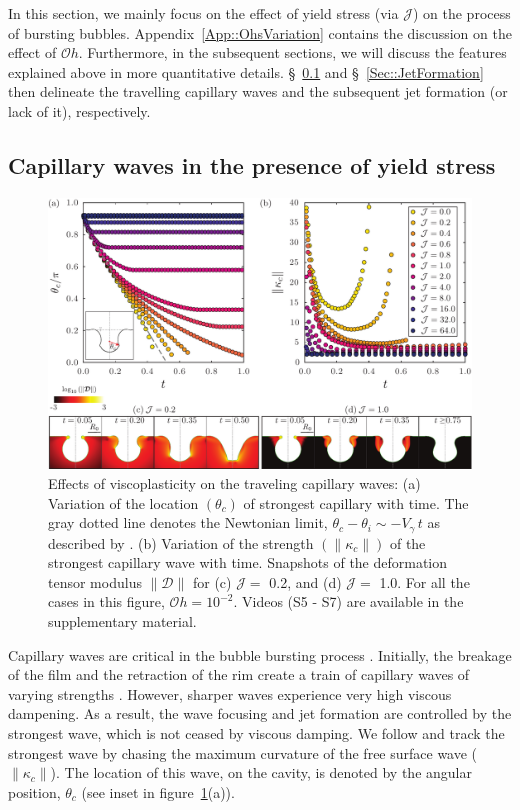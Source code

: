 \documentclass[final]{jfm}
\begin{document}
In this section, we mainly focus on the effect of yield stress (via $\mathcal{J}$) on the process of bursting bubbles. Appendix~\ref{App::OhsVariation} contains the discussion on the effect of $\mathcal{O}h$. Furthermore, in the subsequent sections, we will discuss the features explained above in more quantitative details. \S~\ref{Sec::CapillaryWaves} and \S~\ref{Sec::JetFormation} then delineate the travelling capillary waves and the subsequent jet formation (or lack of it), respectively.  

\subsection{Capillary waves in the presence of yield stress}\label{Sec::CapillaryWaves}
\begin{figure}
	\centerline{\includegraphics[width=\linewidth]{Figures/Figure3_EarlyTimes-eps-converted-to.pdf}}%
	\caption{Effects of viscoplasticity on the traveling capillary waves: (a) Variation of the location $\left(\theta_c\right)$ of strongest capillary with time. The gray dotted line denotes the Newtonian limit, $\theta_c -\theta_i \sim -V_\gamma\,t$ as described by \citet{gordillo2019capillary}. (b) Variation of the strength $\left(\|\kappa_c\|\right)$ of the strongest capillary wave with time. Snapshots of the deformation tensor modulus $\|\boldsymbol{\mathcal{D}}\|$ for (c) $\mathcal{J} =$ 0.2, and (d) $\mathcal{J} =$ 1.0. For all the cases in this figure, $\mathcal{O}h = 10^{-2}$. Videos (S5 - S7) are available in the supplementary material.}
	\label{fig:Jcar_EarlyTimes}
\end{figure}
Capillary waves are critical in the bubble bursting process \citep{gordillo2019capillary}. Initially, the breakage of the film and the retraction of the rim create a train of capillary waves of varying strengths \citep{gekle2009high}. However, sharper waves experience very high viscous dampening. As a result, the wave focusing and jet formation are controlled by the strongest wave, which is not ceased by viscous damping. We follow \citet{gordillo2019capillary} and track the strongest wave by chasing the maximum curvature of the free surface wave ($\|\kappa_c\|$). The location of this wave, on the cavity, is denoted by the angular position, $\theta_c$ (see inset in figure~\ref{fig:Jcar_EarlyTimes}(a)). 
\end{document}
